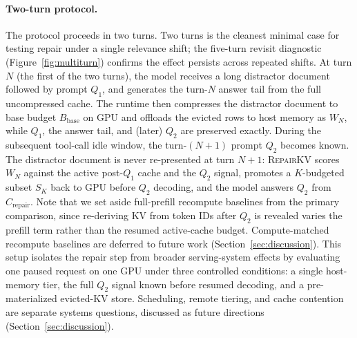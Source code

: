 \documentclass{article}
\newcommand{\repairkv}{\textsc{RepairKV}}
\newcommand{\bbase}{\ensuremath{B_{\mathrm{base}}}}
\begin{document}
\paragraph{Two-turn protocol.}
The protocol proceeds in two turns. 
Two turns is the cleanest minimal case for testing
repair under a single relevance shift; the five-turn revisit
diagnostic (Figure~\ref{fig:multiturn}) confirms the effect persists
across repeated shifts.
At turn $N$ (the first of the two turns), the model
receives a long distractor document followed by prompt $Q_1$, and
generates the turn-$N$ answer tail from the full uncompressed cache.
The runtime then compresses the distractor document to base budget
$\bbase$ on GPU and offloads the evicted rows to host memory as
$W_N$, while $Q_1$, the answer tail, and (later) $Q_2$ are preserved
exactly. During the subsequent tool-call idle window, the
turn-$(N{+}1)$ prompt $Q_2$ becomes known. The distractor document
is never re-presented at turn $N{+}1$: \repairkv{} scores $W_N$
against the active post-$Q_1$ cache and the $Q_2$ signal, promotes a
$K$-budgeted subset $S_K$ back to GPU before $Q_2$ decoding, and the
model answers $Q_2$ from $C_{\mathrm{repair}}$.
Note that we set aside full-prefill recompute baselines
from the primary comparison, since re-deriving KV from token IDs after
$Q_2$ is revealed varies the prefill term rather than the resumed
active-cache budget. Compute-matched recompute baselines are deferred to
future work (Section~\ref{sec:discussion}).
This setup isolates the repair step from broader serving-system effects by
evaluating one paused request on one GPU under three controlled conditions:
a single host-memory tier, the full $Q_2$ signal known before resumed
decoding, and a pre-materialized evicted-KV store.
Scheduling, remote tiering, and cache contention are separate systems
questions, discussed as future directions
(Section~\ref{sec:discussion}).
\end{document}
